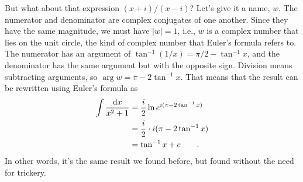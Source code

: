 But what about that expression $(x+i)/(x-i)$? Let's give it a name,
$w$. The numerator and denominator are complex conjugates of one
another. Since they have the same magnitude, we must have $|w|=1$,
i.e., $w$ is a complex number that lies on the unit circle, the
kind of complex number that Euler's formula refers to. The numerator
has an argument of $\tan^{-1}(1/x)=\pi/2-\tan^{-1}x$, and the denominator
has the same argument but with the opposite sign. Division means subtracting
arguments, so $\arg w=\pi-2\tan^{-1}x$. That means that the result can
be rewritten using Euler's formula as
\begin{align*}
  \int \frac{\textup{d} x}{x^2+1} &= \frac{i}{2}\ln e^{i(\pi-2\tan^{-1}x)} \\
      &=  \frac{i}{2}\cdot i(\pi-2\tan^{-1}x) \\
      &=  \tan^{-1}x + c \qquad .
\end{align*}
In other words, it's the same result we found before, but found 
without the need for trickery.

